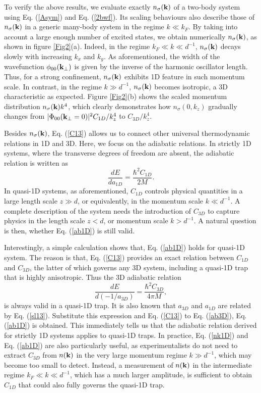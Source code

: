 \documentclass[twocolumn, prl]{revtex4}
\begin{document}
To verify the above results, we evaluate exactly $n_\sigma({\bf k})$ of a two-body system using Eq. (\ref{Asym}) and Eq. (\ref{2bwf}). Its scaling behaviours also describe those of $n_\sigma({\bf k})$ in a generic many-body system in the regime $k\ll k_F$. By taking into account a large enough number of excited states, we obtain numerically $n_\sigma ({\bf k})$, as shown in figure \ref{Fig2}(a). Indeed, in the regime $k_F\ll k\ll d^{-1}$, $n_\sigma({\bf k})$ decays slowly with increasing $k_x$ and $k_y$. As aforementioned, the width of the wavefunction $\phi_{00}({\bf k_\bot})$ is given by the inverse of the harmonic oscillator length. Thus, for a strong confinement, $n_\sigma({\bf k})$ exhibits 1D feature in such momentum scale. In contrast, in the regime $k\gg d^{-1}$, $n_\sigma({\bf k})$ becomes isotropic, a 3D characteristic as expected. Figure \ref{Fig2}(b) shows the scaled momentum distribution $n_\sigma({\bf k})k^4$, which clearly demonstrates how $n_\sigma(0,k_z)$ gradually changes from $|\Phi_{00}({\bf k}_\bot=0)|^2{ C_{1D}}/{k_z^{4}}$ to ${ C_{3D}}/{k_z^{4}}$.

Besides $n_\sigma({\bf k})$, Eq. (\ref{C13}) allows us to connect other universal thermodynamic relations in 1D and 3D.  Here, we focus on the adiabatic relations. In strictly 1D systems, where the transverse degrees of freedom are absent, the adiabatic relation is written as \cite{V5}
\begin{equation}
\frac{dE}{da_{1D}}=\frac{\hbar^2C_{1D}}{2M}. \label{ab1D}
\end{equation}
In quasi-1D systems, as aforementioned, $C_{1D}$ controls physical quantities in a large length scale $z\gg d$, or equivalently, in the momentum scale $k\ll d^{-1}$. A complete description of the system needs the introduction of $C_{3D}$ to capture physics in the length scale $z<d$, or momentum scale $k>d^{-1}$. A natural question is then, whether Eq. (\ref{ab1D}) is still valid. 

Interestingly, a simple calculation shows that, Eq. (\ref{ab1D}) holds for quasi-1D system. The reason is that, Eq. (\ref{C13}) provides an exact relation between $C_{1D}$ and $C_{3D}$, the latter of which governs any 3D system, including a quasi-1D trap that is highly anisotropic. Thus the 3D adiabatic relation \cite{Tan2}
\begin{equation}
\frac{dE}{d(-1/a_{3D})}=\frac{\hbar^2C_{3D}}{4\pi M },\label{ab3D}
\end{equation}
is always valid in a quasi-1D trap. It is also known that $a_{3D}$ and $a_{1D}$ are related by Eq. (\ref{sl13}). Substitute this expression and Eq. (\ref{C13}) to Eq. (\ref{ab3D}), Eq. (\ref{ab1D}) is obtained. This immediately tells us that the adiabatic relation derived for strictly 1D systems applies to quasi-1D traps. In practice, Eq. (\ref{nk1D}) and Eq. (\ref{ab1D}) are also particularly useful, as experimentalists do not need to extract $C_{3D}$ from $n({\bf k})$ in the very large momentum regime $k\gg d^{-1}$, which may become too small to detect. Instead, a measurement of $n({\bf k})$ in the intermediate regime $k_F\ll k\ll d^{-1}$, which has a much larger amplitude, is sufficient to obtain $C_{1D}$ that could also fully governs the quasi-1D trap.
\end{document}
